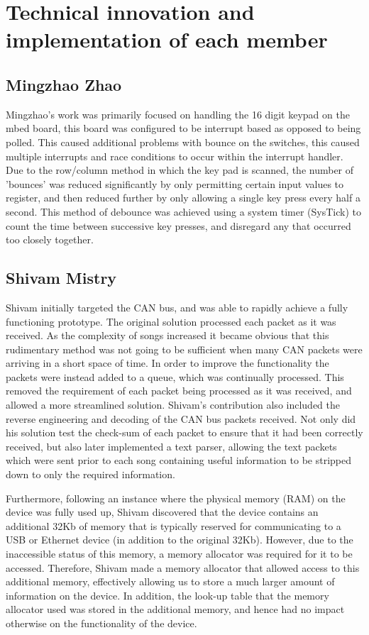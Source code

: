 \section{Technical innovation and implementation of each member}
\subsection*{Mingzhao Zhao}
Mingzhao's work was primarily focused on handling the 16 digit keypad on the 
mbed board, this board was configured to be interrupt based as opposed to  being 
polled. This caused additional problems with bounce on the switches, this 
caused multiple interrupts and race conditions to occur within the interrupt 
handler. Due to the row/column method in which the key pad is scanned, the 
number of 'bounces' was reduced significantly by only permitting certain 
input values to register, and then reduced further by only allowing a single key 
press every half a second. This method of debounce was achieved using a system 
timer (SysTick) to count the time between successive key presses, and disregard 
any that occurred too closely together. 

\subsection*{Shivam Mistry}
Shivam initially targeted the CAN bus, and was able to rapidly achieve a fully 
functioning prototype. The original solution processed each packet as it was 
received. As the complexity of songs increased it became obvious that this 
rudimentary method was not going to be sufficient when many CAN packets were 
arriving in a short space of time. In order to improve the functionality the 
packets were instead added to a queue, which was continually processed. This 
removed the requirement of each packet being processed as it was received, and 
allowed a more streamlined solution. Shivam's contribution also included the 
reverse engineering and decoding of the CAN bus packets received. Not only did 
his solution test the check-sum of each packet to ensure that it had been 
correctly received, but also later implemented a text parser, allowing the 
text packets which were sent prior to each song containing useful information 
to be stripped down to only the required information. 

Furthermore, following an 
instance where the physical memory (RAM) on the device was fully used up, Shivam 
discovered that the device contains an additional 32Kb of memory that is 
typically reserved for communicating to a USB or Ethernet device (in addition 
to the original 32Kb). However, due to the inaccessible status of this memory, 
a memory allocator was required for it to be accessed. Therefore, Shivam made a 
memory allocator that allowed access to this additional memory, effectively 
allowing us to store a much larger amount of information on the device. In 
addition, the look-up table that the memory allocator used was stored in the 
additional memory, and hence had no impact otherwise on the functionality of the 
device. 

